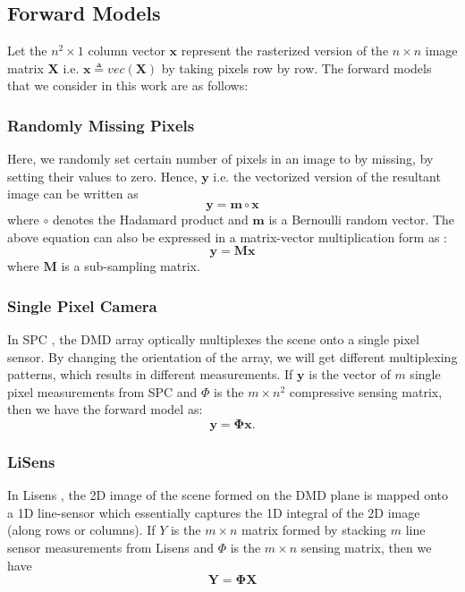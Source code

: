 \documentclass[journal,twoside]{IEEEtran}
\newcommand{\X}{\mathbf{X}}
\newcommand{\Y}{\mathbf{Y}}
\newcommand{\x}{\mathbf{x}}
\newcommand{\y}{\mathbf{y}}
\begin{document}
\subsection{Forward Models}
Let the $n^2 \times 1$ column vector $\mathbf{x}$ represent the rasterized version of the $n \times n$ image matrix $\X$ i.e. $\mathbf{x} \triangleq vec(\X)$ by taking pixels row by row. The forward models that we consider in this work are as follows:
\subsubsection{Randomly Missing Pixels}
Here, we randomly set certain number of pixels in an image to by missing, by setting their values to zero. Hence, $\y$ i.e. the vectorized version of the resultant image can be written as 
\begin{equation}
\y = \mathbf{m} \circ \x
\end{equation}
where $\circ$ denotes the Hadamard product and $\mathbf{m}$ is a Bernoulli random vector. The above equation can also be expressed in a matrix-vector multiplication form as :  
\begin{equation}
\y = \mathbf{M} \x
\end{equation}
where $\mathbf{M}$ is a sub-sampling matrix. 

\subsubsection{Single Pixel Camera}
In SPC \cite{duarte2008single}, the DMD array optically multiplexes the scene onto a single pixel sensor. By changing the orientation of the array, we will get different multiplexing patterns, which results in different measurements. If $\y$ is the vector of $m$ single pixel measurements from SPC and $\Phi$ is the $m \times n^2$ compressive sensing matrix, then we have the forward model as:
\begin{equation}
\y = \bm{\Phi} \x.
\end{equation}

\subsubsection{LiSens}
In Lisens \cite{wang2015lisens}, the 2D image of the scene formed on the DMD plane is mapped onto a 1D line-sensor which essentially captures the 1D integral of the 2D image (along rows or columns). If $Y$ is the $m \times n$ matrix formed by stacking $m$ line sensor measurements from Lisens and $\Phi$ is the $m \times n$ sensing matrix, then we have
\begin{equation}
\Y = \bm{\Phi} \X
\end{equation}
\end{document}
